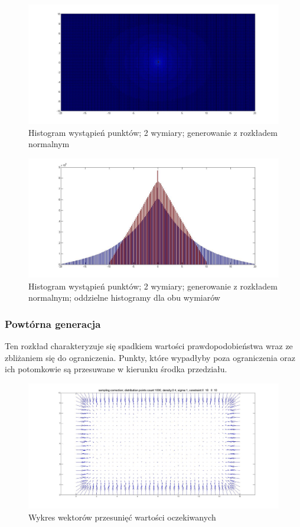 \documentclass{mini}
\begin{document}
\begin{figure}[H]
\centering
\includegraphics[width=\textwidth]{ri_n_10M_2__20_20__10_10_4}
\caption{Histogram wystąpień punktów; 2 wymiary; generowanie z rozkładem normalnym}
\end{figure}

\begin{figure}[H]
\centering
\includegraphics[width=\textwidth]{ri_n_10M_2__20_20__10_10_4_1D}
\caption{Histogram wystąpień punktów; 2 wymiary; generowanie z rozkładem normalnym; oddzielne histogramy dla obu wymiarów}
\label{bladzenie:reinicjacja2ds}
\end{figure}

\subsubsection*{Powtórna generacja}
Ten rozkład charakteryzuje się spadkiem wartości prawdopodobieństwa wraz ze zbliżaniem się do ograniczenia. Punkty, które wypadłyby poza ograniczenia oraz ich potomkowie są przesuwane w kierunku środka przedziału.

\begin{figure}[H]
\centering
\includegraphics[width=\textwidth]{sampling2dprzesuniecie}
\caption{Wykres wektorów przesunięć wartości oczekiwanych}
\end{figure}
\end{document}
